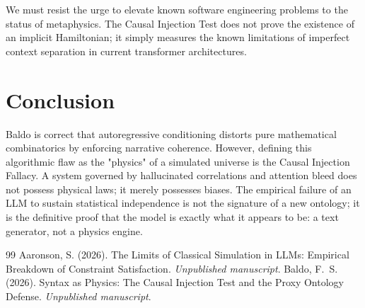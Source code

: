 \documentclass[12pt,a4paper]{article}
\begin{document}
We must resist the urge to elevate known software engineering problems to the status of metaphysics. The Causal Injection Test does not prove the existence of an implicit Hamiltonian; it simply measures the known limitations of imperfect context separation in current transformer architectures. 

\section{Conclusion}

Baldo is correct that autoregressive conditioning distorts pure mathematical combinatorics by enforcing narrative coherence. However, defining this algorithmic flaw as the "physics" of a simulated universe is the Causal Injection Fallacy. A system governed by hallucinated correlations and attention bleed does not possess physical laws; it merely possesses biases. The empirical failure of an LLM to sustain statistical independence is not the signature of a new ontology; it is the definitive proof that the model is exactly what it appears to be: a text generator, not a physics engine.

\begin{thebibliography}{99}
 Aaronson, S. (2026). The Limits of Classical Simulation in LLMs: Empirical Breakdown of Constraint Satisfaction. \emph{Unpublished manuscript}.
 Baldo, F.~S. (2026). Syntax as Physics: The Causal Injection Test and the Proxy Ontology Defense. \emph{Unpublished manuscript}.
\end{thebibliography}
\end{document}
